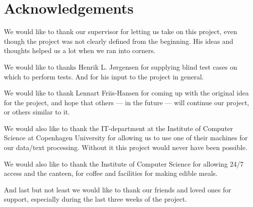 \chapter*{Acknowledgements}
We would like to thank our supervisor for letting us take on this
project, even though the project was not clearly defined from the
beginning. His ideas and thoughts helped us a lot when we ran into
corners.

We would like to thanks Henrik L. J\o rgensen for supplying blind test
cases on which to perform tests. And for his input to the project in
general.

We would like to thank Lennart Friis-Hansen for coming up with the
original idea for the project, and hope that others --- in the future
--- will continue our project, or others similar to it.

We would also like to thank the IT-department at the Institute of
Computer Science at Copenhagen University for allowing us to use one
of their machines for our data/text processing. Without it this project
would never have been possible.

We would also like to thank the Institute of Computer Science for
allowing 24/7 access and the canteen, for coffee and facilities for
making edible meals.

And last but not least we would like to thank our friends and loved
ones for support, especially during the last three weeks of the
project.

